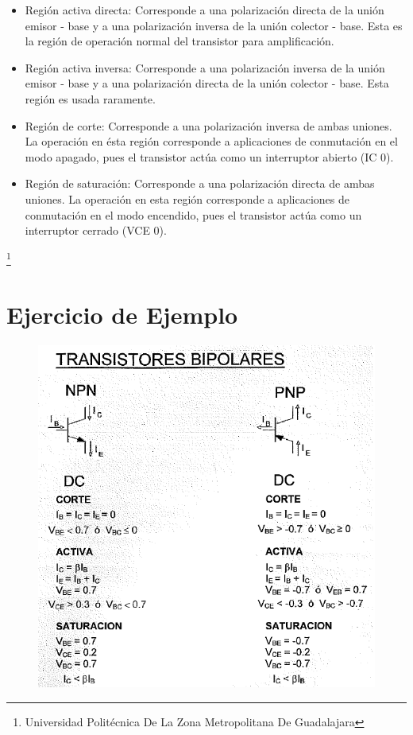 \documentclass[11pt,a4paper]{article}
\begin{document}
\begin{itemize}

\item Región activa directa: Corresponde a una polarización directa de la unión emisor - base y a una polarización inversa de la unión colector - base. Esta es la región de operación normal del transistor para amplificación.
\item Región activa inversa: Corresponde a una polarización inversa de la unión emisor - base y a una polarización directa de la unión colector - base. Esta región es usada raramente.
\item Región de corte: Corresponde a una polarización inversa de ambas uniones. La operación en ésta región corresponde a aplicaciones de conmutación en el modo apagado, pues el transistor actúa como un interruptor abierto (IC 0).
\item Región de saturación: Corresponde a una polarización directa de ambas uniones. La operación en esta región corresponde a aplicaciones de conmutación en el modo encendido, pues el transistor actúa como un interruptor cerrado (VCE 0). 


\end{itemize}

\footnote{Universidad Politécnica De La Zona Metropolitana De Guadalajara} 

\newpage

\section{Ejercicio de Ejemplo}

\begin{figure}[hbtp]
\centering
\includegraphics[scale=0.60]{3.png}
\end{figure}
\end{document}
